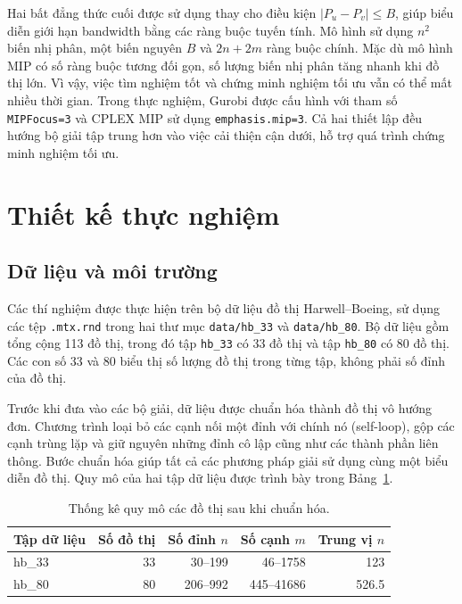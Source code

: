 \documentclass[a4paper,fleqn]{cas-sc}
\newcommand{\code}[1]{\nolinkurl{#1}}
\begin{document}
Hai bất đẳng thức cuối được sử dụng thay cho điều kiện $|P_u-P_v|\leq B$, giúp biểu diễn giới hạn bandwidth bằng các ràng buộc tuyến tính. Mô hình sử dụng $n^2$ biến nhị phân, một biến nguyên $B$ và $2n+2m$ ràng buộc chính. Mặc dù mô hình MIP có số ràng buộc tương đối gọn, số lượng biến nhị phân tăng nhanh khi đồ thị lớn. Vì vậy, việc tìm nghiệm tốt và chứng minh nghiệm tối ưu vẫn có thể mất nhiều thời gian. Trong thực nghiệm, Gurobi được cấu hình với tham số \code{MIPFocus=3} và CPLEX MIP sử dụng \code{emphasis.mip=3}. Cả hai thiết lập đều hướng bộ giải tập trung hơn vào việc cải thiện cận dưới, hỗ trợ quá trình chứng minh nghiệm tối ưu.


\section{Thiết kế thực nghiệm}

\subsection{Dữ liệu và môi trường}

Các thí nghiệm được thực hiện trên bộ dữ liệu đồ thị Harwell--Boeing, sử dụng các tệp \code{.mtx.rnd} trong hai thư mục \code{data/hb_33} và \code{data/hb_80}. Bộ dữ liệu gồm tổng cộng 113 đồ thị, trong đó tập \code{hb_33} có 33 đồ thị và tập \code{hb_80} có 80 đồ thị. Các con số 33 và 80 biểu thị số lượng đồ thị trong từng tập, không phải số đỉnh của đồ thị.

Trước khi đưa vào các bộ giải, dữ liệu được chuẩn hóa thành đồ thị vô hướng đơn. Chương trình loại bỏ các cạnh nối một đỉnh với chính nó (self-loop), gộp các cạnh trùng lặp và giữ nguyên những đỉnh cô lập cũng như các thành phần liên thông. Bước chuẩn hóa giúp tất cả các phương pháp giải sử dụng cùng một biểu diễn đồ thị. Quy mô của hai tập dữ liệu được trình bày trong Bảng~\ref{tab:dataset}.

\begin{table}[pos=H]
\centering
\caption{Thống kê quy mô các đồ thị sau khi chuẩn hóa.}
\label{tab:dataset}
\small
\begin{tabular}{lrrrr}
\toprule
\textbf{Tập dữ liệu} & \textbf{Số đồ thị} & \textbf{Số đỉnh $n$} & \textbf{Số cạnh $m$} & \textbf{Trung vị $n$} \\
\midrule
hb\_33 & 33 & 30--199 & 46--1758 & 123 \\
hb\_80 & 80 & 206--992 & 445--41686 & 526.5 \\
\bottomrule
\end{tabular}
\end{table}
\end{document}
